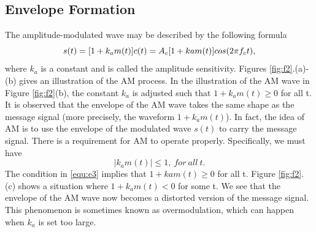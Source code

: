 \subsection{Envelope Formation}
The amplitude-modulated wave may be described by the following formula
\begin{equation}
  s(t) = [1 + k_a m(t)] c(t)\\
  = A_c [1 + k a m(t)] cos(2\pi f_c t),
\end{equation}
where $k_a$ is a constant and is called the amplitude sensitivity. Figures \ref{fig:f2}.(a)-(b) gives an illustration
of the AM process. In the illustration of the AM wave in Figure \ref{fig:f2}(b), the constant $k_a$ is adjusted
such that $1 + k_a m(t) \geq 0$ for all t. It is observed that the envelope of the AM wave takes the same
shape as the message signal (more precisely, the waveform $1 + k_a m(t)$). In fact, the idea of AM is
to use the envelope of the modulated wave $s(t)$ to carry the message signal. There is a requirement for AM to operate properly. Specifically, we must have
\begin{equation}
  |k_a m(t)| \leq 1, ~for~ all~ t.
  \label{equ:e3}
\end{equation}
The condition in \ref{equ:e3} implies that $1 + k a m(t) \geq 0$ for all t. Figure \ref{fig:f2}.(c) shows a situation where
$1 + k_a m(t) < 0$ for some t. We see that the envelope of the AM wave now becomes a distorted version of the message signal. This phenomenon is sometimes known as overmodulation, which can
happen when $k_a$ is set too large.

